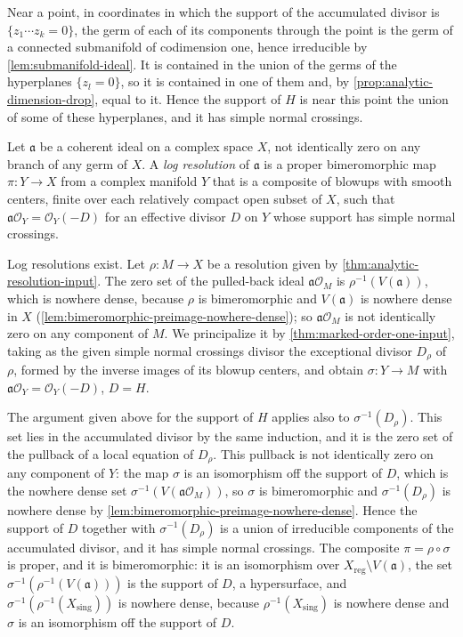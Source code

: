 Near a point, in coordinates in which the support of the accumulated divisor is $\{z_1\cdots z_k=0\}$, the germ of each of its components through the point is the germ of a connected submanifold of codimension one, hence irreducible by \cref{lem:submanifold-ideal}. It is contained in the union of the germs of the hyperplanes $\{z_l=0\}$, so it is contained in one of them and, by \cref{prop:analytic-dimension-drop}, equal to it. Hence the support of $H$ is near this point the union of some of these hyperplanes, and it has simple normal crossings.

Let $\mathfrak a$ be a coherent ideal on a complex space $X$, not identically zero on any branch of any germ of $X$. A \emph{log resolution} of $\mathfrak a$ is a proper bimeromorphic map $\pi\colon Y\to X$ from a complex manifold $Y$ that is a composite of blowups with smooth centers, finite over each relatively compact open subset of $X$, such that $\mathfrak a\mathcal O_Y=\mathcal O_Y(-D)$ for an effective divisor $D$ on $Y$ whose support has simple normal crossings.

Log resolutions exist. Let $\rho\colon M\to X$ be a resolution given by \cref{thm:analytic-resolution-input}. The zero set of the pulled-back ideal $\mathfrak a\mathcal O_M$ is $\rho^{-1}(V(\mathfrak a))$, which is nowhere dense, because $\rho$ is bimeromorphic and $V(\mathfrak a)$ is nowhere dense in $X$ (\cref{lem:bimeromorphic-preimage-nowhere-dense}); so $\mathfrak a\mathcal O_M$ is not identically zero on any component of $M$. We principalize it by \cref{thm:marked-order-one-input}, taking as the given simple normal crossings divisor the exceptional divisor $D_\rho$ of $\rho$, formed by the inverse images of its blowup centers, and obtain $\sigma\colon Y\to M$ with $\mathfrak a\mathcal O_Y=\mathcal O_Y(-D)$, $D=H$.

The argument given above for the support of $H$ applies also to $\sigma^{-1}(D_\rho)$. This set lies in the accumulated divisor by the same induction, and it is the zero set of the pullback of a local equation of $D_\rho$. This pullback is not identically zero on any component of $Y$: the map $\sigma$ is an isomorphism off the support of $D$, which is the nowhere dense set $\sigma^{-1}(V(\mathfrak a\mathcal O_M))$, so $\sigma$ is bimeromorphic and $\sigma^{-1}(D_\rho)$ is nowhere dense by \cref{lem:bimeromorphic-preimage-nowhere-dense}. Hence the support of $D$ together with $\sigma^{-1}(D_\rho)$ is a union of irreducible components of the accumulated divisor, and it has simple normal crossings. The composite $\pi=\rho\circ\sigma$ is proper, and it is bimeromorphic: it is an isomorphism over $X_{\mathrm{reg}}\setminus V(\mathfrak a)$, the set $\sigma^{-1}(\rho^{-1}(V(\mathfrak a)))$ is the support of $D$, a hypersurface, and $\sigma^{-1}(\rho^{-1}(X_{\mathrm{sing}}))$ is nowhere dense, because $\rho^{-1}(X_{\mathrm{sing}})$ is nowhere dense and $\sigma$ is an isomorphism off the support of $D$.

